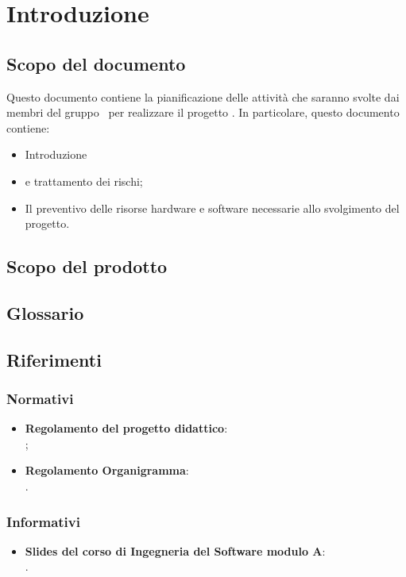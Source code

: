 \section{Introduzione}
\subsection{Scopo del documento}
Questo documento contiene la pianificazione delle attività che saranno svolte dai membri del gruppo \gruppo\ per realizzare il progetto \progetto. In particolare, questo documento contiene:

	\begin{itemize}
		\item Introduzione
		\item {} e trattamento dei rischi;
		\item Il preventivo delle risorse hardware e software necessarie allo svolgimento del progetto.
	\end{itemize}
	
\subsection{Scopo del prodotto}
\scopoProdotto

\subsection{Glossario}
\descrizioneGlossario

\subsection{Riferimenti}
\subsubsection{Normativi}
\riferimentiNormativi
	\begin{itemize}
		\item \textbf{Regolamento del progetto didattico}:\\
		;
		\item \textbf{Regolamento Organigramma}:\\
		.
	\end{itemize}

\subsubsection{Informativi}
	\begin{itemize}
		\item \textbf{Slides del corso di Ingegneria del Software modulo A}:\\
		.
	\end{itemize}




